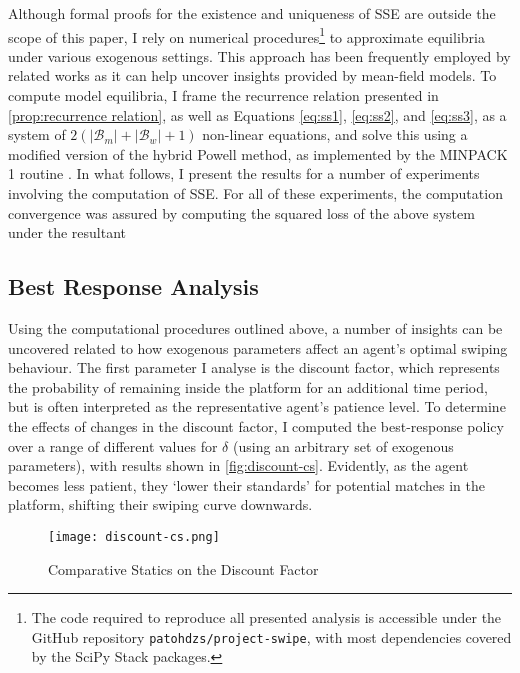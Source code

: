 Although formal proofs for the existence and uniqueness of SSE are outside the scope of this paper, I rely on numerical procedures\footnote{The code required to reproduce all presented analysis is accessible under the GitHub repository \texttt{patohdzs/project-swipe}, with most dependencies covered by the SciPy Stack packages.} to approximate equilibria under various exogenous settings. 
This approach has been frequently employed by related works \citep[see][]{iyer2014mean, gummadi2011optimal} as it can help uncover insights provided by mean-field models. 
To compute model equilibria, I frame the recurrence relation presented in \autoref{prop:recurrence relation}, as well as Equations \ref{eq:ss1}, \ref{eq:ss2}, and \ref{eq:ss3}, as a system of $2(|\mathcal{B}_m|+|\mathcal{B}_w|+1)$ non-linear equations, and solve this using a modified version of the hybrid Powell method, as implemented by the MINPACK 1 routine \citep{more1980user}. In what follows, I present the results for a number of experiments involving the computation of SSE. For all of these experiments, the computation convergence was assured by computing the squared loss of the above system under the resultant 

\subsection{Best Response Analysis}\label{sec:section3.2} 
Using the computational procedures outlined above, a number of insights can be uncovered related to how exogenous parameters affect an agent's optimal swiping behaviour. 
The first parameter I analyse is the discount factor, which represents the probability of remaining inside the platform for an additional time period, but is often interpreted as the representative agent's patience level.
To determine the effects of changes in the discount factor, I computed the best-response policy over a range of different values for $\delta$ (using an arbitrary set of exogenous parameters), with results shown in \autoref{fig:discount-cs}. 
Evidently, as the agent becomes less patient, they `lower their standards' for potential matches in the platform, shifting their swiping curve downwards. 

\begin{figure}[ht] 
    \centering
    \caption{Comparative Statics on the Discount Factor}
    \texttt{[image: discount-cs.png]}
    \label{fig:discount-cs}
\end{figure} 

